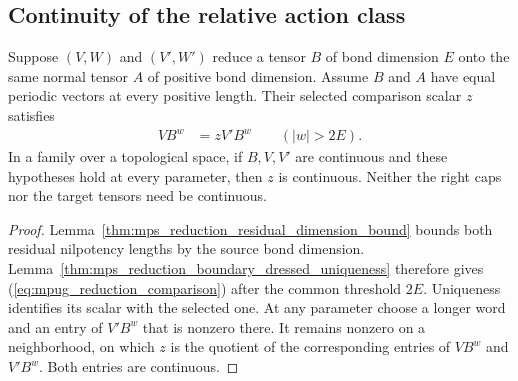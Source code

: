 \subsection{Continuity of the relative action class}

\begin{lemma}
    \label{lem:mpug_reduction_scalar_continuity}
    \leanok
    Suppose $(V,W)$ and $(V',W')$ reduce a tensor $B$ of bond dimension $E$
    onto the same normal tensor $A$ of positive bond dimension. Assume
    $B$ and $A$ have equal periodic vectors at every positive length.
    Their selected comparison scalar $z$ satisfies
    \begin{align}
        VB^w & =zV'B^w\qquad (|w|>2E).
        \label{eq:mpug_reduction_comparison}
    \end{align}
    In a family over a topological space, if $B,V,V'$ are continuous and
    these hypotheses hold at every parameter, then $z$ is continuous.
    Neither the right caps nor the target tensors need be continuous.
\end{lemma}
\begin{proof}\leanok
    Lemma~\ref{thm:mps_reduction_residual_dimension_bound} bounds both residual
    nilpotency lengths by the source bond dimension.
    Lemma~\ref{thm:mps_reduction_boundary_dressed_uniqueness} therefore gives
    (\ref{eq:mpug_reduction_comparison}) after the common threshold $2E$.
    Uniqueness identifies its
    scalar with the selected one. At any parameter choose a longer word
    and an entry of $V'B^w$ that is nonzero there. It remains nonzero on a
    neighborhood, on which $z$ is the quotient of the corresponding
    entries of $VB^w$ and $V'B^w$. Both entries are continuous.
\end{proof}

